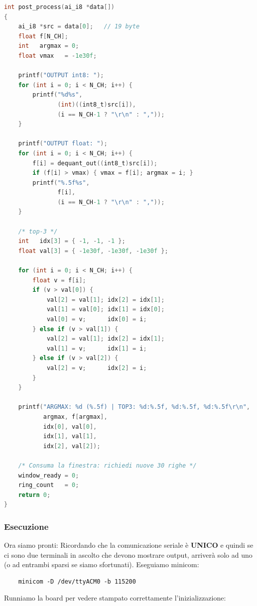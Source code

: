 \begin{lstlisting}[language=C]
int post_process(ai_i8 *data[])
{
    ai_i8 *src = data[0];   // 19 byte
    float f[N_CH];
    int   argmax = 0;
    float vmax   = -1e30f;

    printf("OUTPUT int8: ");
    for (int i = 0; i < N_CH; i++) {
        printf("%d%s",
               (int)((int8_t)src[i]),
               (i == N_CH-1 ? "\r\n" : ","));
    }

    printf("OUTPUT float: ");
    for (int i = 0; i < N_CH; i++) {
        f[i] = dequant_out((int8_t)src[i]);
        if (f[i] > vmax) { vmax = f[i]; argmax = i; }
        printf("%.5f%s",
               f[i],
               (i == N_CH-1 ? "\r\n" : ","));
    }

    /* top-3 */
    int   idx[3] = { -1, -1, -1 };
    float val[3] = { -1e30f, -1e30f, -1e30f };

    for (int i = 0; i < N_CH; i++) {
        float v = f[i];
        if (v > val[0]) {
            val[2] = val[1]; idx[2] = idx[1];
            val[1] = val[0]; idx[1] = idx[0];
            val[0] = v;      idx[0] = i;
        } else if (v > val[1]) {
            val[2] = val[1]; idx[2] = idx[1];
            val[1] = v;      idx[1] = i;
        } else if (v > val[2]) {
            val[2] = v;      idx[2] = i;
        }
    }

    printf("ARGMAX: %d (%.5f) | TOP3: %d:%.5f, %d:%.5f, %d:%.5f\r\n",
           argmax, f[argmax],
           idx[0], val[0],
           idx[1], val[1],
           idx[2], val[2]);

    /* Consuma la finestra: richiedi nuove 30 righe */
    window_ready = 0;
    ring_count   = 0;
    return 0;
}
\end{lstlisting}

\subsubsection{Esecuzione}

Ora siamo pronti: Ricordando che la comunicazione seriale è \textbf{UNICO} e quindi se ci sono due terminali in ascolto che devono mostrare output, arriverà solo ad uno (o ad entrambi sparsi se siamo sfortunati). Eseguiamo minicom: 

\begin{verbatim}
    minicom -D /dev/ttyACM0 -b 115200 
\end{verbatim}
Runniamo la board per vedere stampato correttamente l'inizializzazione:

